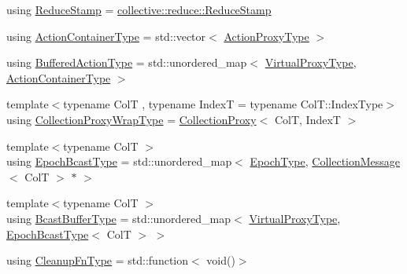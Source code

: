 \begin{DoxyCompactItemize}
using \hyperlink{structvt_1_1vrt_1_1collection_1_1_collection_manager_ae8aac19e0ae07e9225142e5880eac830}{Reduce\+Stamp} = \hyperlink{namespacevt_1_1collective_1_1reduce_a7b7cb3021ac5654d92825d9fab0250b2}{collective\+::reduce\+::\+Reduce\+Stamp}
\item 
using \hyperlink{structvt_1_1vrt_1_1collection_1_1_collection_manager_a536805fb5c58b557b66e7d7febe87567}{Action\+Container\+Type} = std\+::vector$<$ \hyperlink{structvt_1_1vrt_1_1collection_1_1_collection_manager_a98a759caf144277dcd341cdbd5538f59}{Action\+Proxy\+Type} $>$
\item 
using \hyperlink{structvt_1_1vrt_1_1collection_1_1_collection_manager_a7b32db0e6ccafa771ddd72f534a1cf8c}{Buffered\+Action\+Type} = std\+::unordered\+\_\+map$<$ \hyperlink{namespacevt_a1b417dd5d684f045bb58a0ede70045ac}{Virtual\+Proxy\+Type}, \hyperlink{structvt_1_1vrt_1_1collection_1_1_collection_manager_a536805fb5c58b557b66e7d7febe87567}{Action\+Container\+Type} $>$
\item 
{\footnotesize template$<$typename ColT , typename IndexT  = typename Col\+T\+::\+Index\+Type$>$ }\\using \hyperlink{structvt_1_1vrt_1_1collection_1_1_collection_manager_a56458ed7f9bb22b631b9b3a745f42f94}{Collection\+Proxy\+Wrap\+Type} = \hyperlink{structvt_1_1vrt_1_1collection_1_1_collection_proxy}{Collection\+Proxy}$<$ ColT, IndexT $>$
\item 
{\footnotesize template$<$typename ColT $>$ }\\using \hyperlink{structvt_1_1vrt_1_1collection_1_1_collection_manager_ade4647c26f1f20016fa0520bea640f59}{Epoch\+Bcast\+Type} = std\+::unordered\+\_\+map$<$ \hyperlink{namespacevt_a985a5adf291c34a3ca263b3378388236}{Epoch\+Type}, \hyperlink{structvt_1_1vrt_1_1collection_1_1_collection_message}{Collection\+Message}$<$ ColT $>$ $\ast$ $>$
\item 
{\footnotesize template$<$typename ColT $>$ }\\using \hyperlink{structvt_1_1vrt_1_1collection_1_1_collection_manager_af3a8c8a3c37301a98aa62f265858a3c0}{Bcast\+Buffer\+Type} = std\+::unordered\+\_\+map$<$ \hyperlink{namespacevt_a1b417dd5d684f045bb58a0ede70045ac}{Virtual\+Proxy\+Type}, \hyperlink{structvt_1_1vrt_1_1collection_1_1_collection_manager_ade4647c26f1f20016fa0520bea640f59}{Epoch\+Bcast\+Type}$<$ ColT $>$ $>$
\item 
using \hyperlink{structvt_1_1vrt_1_1collection_1_1_collection_manager_a95c122e5b83bc51c306c9367b8e62c07}{Cleanup\+Fn\+Type} = std\+::function$<$ void()$>$
\item 

\end{DoxyCompactItemize}
